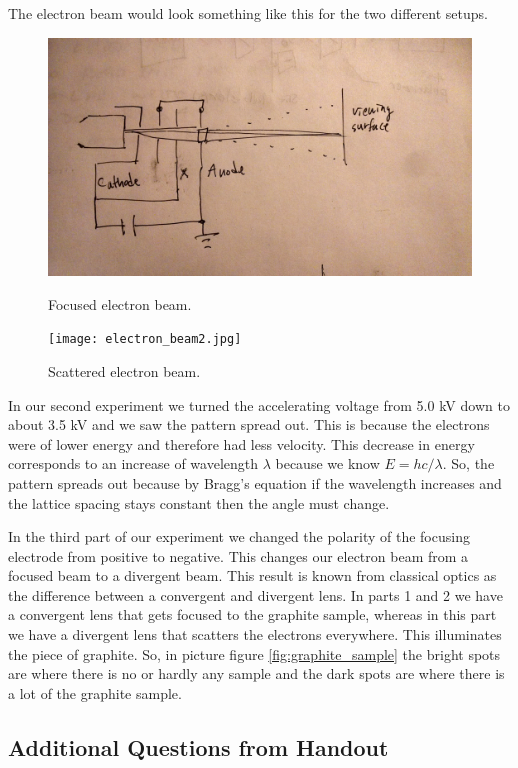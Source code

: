 \documentclass[12pt letterpaper]{article}
\begin{document}
The electron beam would look something like this for the two different setups. 
\begin{figure}[H]
  \caption{Focused electron beam.}
  \centering
    \includegraphics[width=.75\textwidth]{electron_beam1.jpg}
    \label{fig:ebeam1}
\end{figure}

\begin{figure}[H]
  \caption{Scattered electron beam.}
  \centering
    \texttt{[image: electron\_beam2.jpg]}
    \label{fig:ebeam2}
\end{figure}


In our second experiment we turned the accelerating voltage from 5.0 kV down to about 3.5 kV and we saw the pattern spread out. This is because the electrons were of lower energy and therefore had less velocity. This decrease in energy corresponds to an increase of wavelength $\lambda$ because we know $ E = hc / \lambda $. So, the pattern spreads out because by Bragg's equation if the wavelength increases and the lattice spacing stays constant then the angle must change. 

In the third part of our experiment we changed the polarity of the focusing electrode from positive to negative. This changes our electron beam from a focused beam to a divergent beam. This result is known from classical optics as the difference between a convergent and divergent lens. In parts 1 and 2 we have a convergent lens that gets focused to the graphite sample, whereas in this part we have a divergent lens that scatters the electrons everywhere. This illuminates the piece of graphite. So, in picture figure \ref{fig:graphite_sample} the bright spots are where there is no or hardly any sample and the dark spots are where there is a lot of the graphite sample. 

\subsection*{Additional Questions from Handout}
\end{document}
